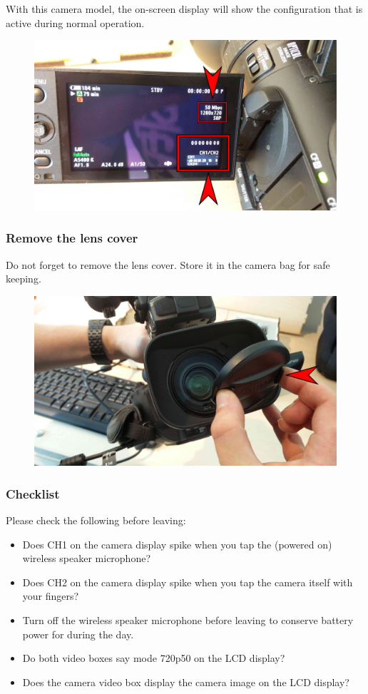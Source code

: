 \documentclass{article}
\begin{document}
With this camera model, the on-screen display will show the configuration that is active during normal operation.
\begin{figure}[H]
  \centering
\includegraphics[width = 120mm]{Canon06.jpg}
\end{figure}

\subsubsection{Remove the lens cover}
Do not forget to remove the lens cover. Store it in the camera bag for safe keeping.

\begin{figure}[H]
  \centering
\includegraphics[width = 120mm]{Canon07.jpg}
\end{figure}

\subsubsection{Checklist}
Please check the following before leaving:
\begin{itemize}
  \item Does CH1 on the camera display spike when you tap the (powered on) wireless speaker microphone?
  \item Does CH2 on the camera display spike when you tap the camera itself with your fingers?
  \item Turn off the wireless speaker microphone before leaving to conserve battery power for during the day.
  \item Do both video boxes say mode 720p50 on the LCD display?
  \item Does the camera video box display the camera image on the LCD display?
\end{itemize}
\end{document}
